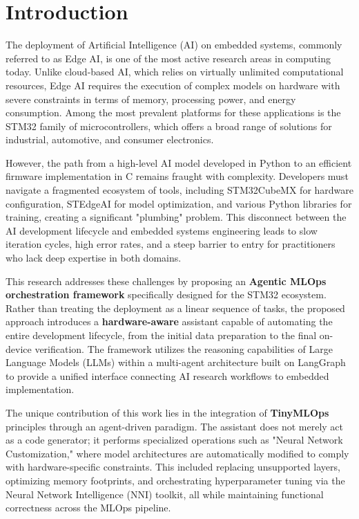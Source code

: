 \chapter{Introduction}

The deployment of Artificial Intelligence (AI) on embedded systems, commonly referred to as Edge AI, is one of the most active research areas in computing today. Unlike cloud-based AI, which relies on virtually unlimited computational resources, Edge AI requires the execution of complex models on hardware with severe constraints in terms of memory, processing power, and energy consumption. Among the most prevalent platforms for these applications is the STM32 family of microcontrollers, which offers a broad range of solutions for industrial, automotive, and consumer electronics.

However, the path from a high-level AI model developed in Python to an efficient firmware implementation in C remains fraught with complexity. Developers must navigate a fragmented ecosystem of tools, including STM32CubeMX for hardware configuration, STEdgeAI for model optimization, and various Python libraries for training, creating a significant "plumbing" problem. This disconnect between the AI development lifecycle and embedded systems engineering leads to slow iteration cycles, high error rates, and a steep barrier to entry for practitioners who lack deep expertise in both domains.

This research addresses these challenges by proposing an \textbf{Agentic MLOps orchestration framework} specifically designed for the STM32 ecosystem. Rather than treating the deployment as a linear sequence of tasks, the proposed approach introduces a \textbf{hardware-aware} assistant capable of automating the entire development lifecycle, from the initial data preparation to the final on-device verification. The framework utilizes the reasoning capabilities of Large Language Models (LLMs) within a multi-agent architecture built on LangGraph to provide a unified interface connecting AI research workflows to embedded implementation.

The unique contribution of this work lies in the integration of \textbf{TinyMLOps} principles through an agent-driven paradigm. The assistant does not merely act as a code generator; it performs specialized operations such as "Neural Network Customization," where model architectures are automatically modified to comply with hardware-specific constraints. This included replacing unsupported layers, optimizing memory footprints, and orchestrating hyperparameter tuning via the Neural Network Intelligence (NNI) toolkit, all while maintaining functional correctness across the MLOps pipeline.

